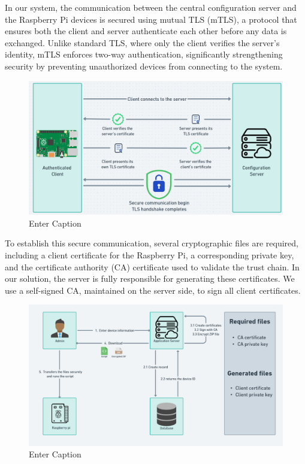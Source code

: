 In our system, the communication between the central configuration server and the Raspberry Pi devices is secured using mutual TLS (mTLS), a protocol that ensures both the client and server authenticate each other before any data is exchanged. Unlike standard TLS, where only the client verifies the server’s identity, mTLS enforces two-way authentication, significantly strengthening security by preventing unauthorized devices from connecting to the system.

  \begin{figure}[H]
    \centering
    \includegraphics[width=0.75\linewidth]{Figures/mtls2.png}
    \caption{Enter Caption}
    \label{fig:enter-label}
\end{figure}

To establish this secure communication, several cryptographic files are required, including a client certificate for the Raspberry Pi, a corresponding private key, and the certificate authority (CA) certificate used to validate the trust chain. In our solution, the server is fully responsible for generating these certificates. We use a self-signed CA, maintained on the server side, to sign all client certificates.

\begin{figure}[H]
    \centering
    \includegraphics[width=0.75\linewidth]{Figures/security-process.png}
    \caption{Enter Caption}
    \label{fig:enter-label}
\end{figure}

